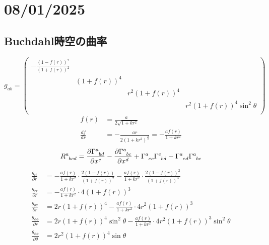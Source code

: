 \documentclass[dvipdfmx]{report} %
\begin{document}
\chapter{08/01/2025}
\section{Buchdahl時空の曲率}
\begin{equation*}
	g_{ab} = 
	\begin{pmatrix}
   	- \frac{(1 - f(r))^2}{(1 + f(r))^2} & & &\\
   	& (1 + f(r))^4 & &\\
	& & r^2(1 + f(r))^4 &\\
	& & & r^2 (1 + f(r))^4 \sin^2{\theta}\\
	\end{pmatrix}
\end{equation*}
\begin{equation*}
\begin{split}
	f(r) &= \frac{a}{2 \sqrt{1 + kr^2} }\\
	\frac{df}{dr} &= - \frac{ar}{2(1 + kr^2)^{\frac{3}{2}}} = - \frac{af(r)}{1 + kr^2}
\end{split}
\end{equation*}
\[
\tensor{R}{^a_{bcd}} =
	\frac{\partial \tensor{\Gamma}{^a_{bd}}}{\partial x^c}
 	- \frac{\partial \tensor{\Gamma}{^a_{bc}}}{\partial x^d}
	+ \tensor{\Gamma}{^a_{ec}}\tensor{\Gamma}{^e_{bd}}
	- \tensor{\Gamma}{^a_{ed}}\tensor{\Gamma}{^a_{bc}}
\]
\begin{equation*}
\begin{split}
	\frac{g_{tt}}{\partial r} &=
		- \frac{a f(r)}{1 + kr^2} \cdot \frac{2(1 - f(r))}{(1 + f(r))^2}
		- \frac{a f(r)}{1 + kr^2} \cdot \frac{2(1 - f(r))^2}{(1 + f(r))^3}\\
	\frac{g_{rr}}{\partial r} &=
		- \frac{a f(r)}{1 + kr^2} \cdot 4(1 + f(r))^3\\
	\frac{g_{\theta \theta}}{\partial r} &=
		2r(1 + f(r))^4
		- \frac{a f(r)}{1 + kr^2} \cdot 4 r^2 (1 + f(r))^3\\
	\frac{g_{\phi \phi}}{\partial r} &=
		2r(1 + f(r))^4\sin^2\theta
		- \frac{a f(r)}{1 + kr^2} \cdot 4 r^2 (1 + f(r))^3\sin^2\theta\\
	\frac{g_{\phi \phi}}{\partial \theta} &=
		2r^2(1 + f(r))^4\sin\theta\\
\end{split}
\end{equation*}
\end{document}
